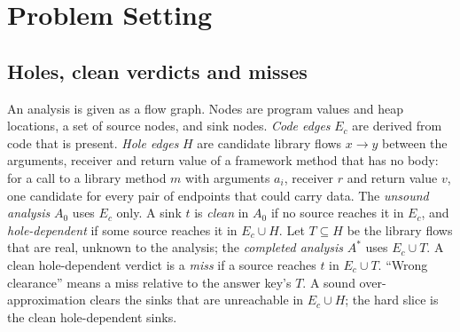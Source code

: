 \section{Problem Setting}
\label{sec:setting}
\subsection{Holes, clean verdicts and misses}
An analysis is given as a flow graph.
Nodes are program values and heap locations, a set of source nodes, and sink nodes.
\emph{Code edges} $E_c$ are derived from code that is present.
\emph{Hole edges} $H$ are candidate library flows $x\to y$ between the arguments, receiver and return value of a framework method that has no body: for a call to a library method $m$ with arguments $a_i$, receiver $r$ and return value $v$, one candidate for every pair of endpoints that could carry data.
The \emph{unsound analysis} $A_0$ uses $E_c$ only.
A sink $t$ is \emph{clean} in $A_0$ if no source reaches it in $E_c$, and \emph{hole-dependent} if some source reaches it in $E_c\cup H$.
Let $T\subseteq H$ be the library flows that are real, unknown to the analysis; the \emph{completed analysis} $A^*$ uses $E_c\cup T$.
A clean hole-dependent verdict is a \emph{miss} if a source reaches $t$ in $E_c\cup T$.
``Wrong clearance'' means a miss relative to the answer key's $T$.
A sound over-approximation clears the sinks that are unreachable in $E_c\cup H$; the hard slice is the clean hole-dependent sinks.

